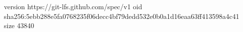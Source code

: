 version https://git-lfs.github.com/spec/v1
oid sha256:5ebb288e5fa0768235f06decc4bf79dedd532e0b0a1d16eaa63ff413598a4c41
size 43840
